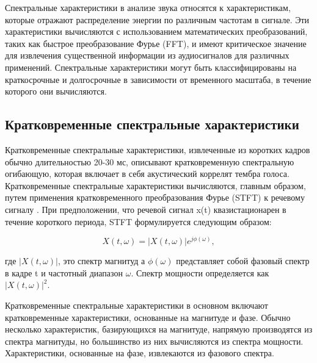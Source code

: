 Спектральные характеристики в анализе звука относятся к характеристикам, которые отражают распределение энергии по различным частотам в сигнале. Эти характеристики вычисляются с использованием математических преобразований, таких как быстрое преобразование Фурье (FFT), и имеют критическое значение для извлечения существенной информации из аудиосигналов для различных применений. Спектральные характеристики могут быть классифицированы на краткосрочные и долгосрочные в зависимости от временного масштаба, в течение которого они вычисляются.

\subsection{Кратковременные спектральные характеристики}

Кратковременные спектральные характеристики, извлеченные из коротких кадров обычно длительностью 20-30 мс, описывают кратковременную спектральную огибающую, которая включает в себя акустический коррелят тембра голоса. Кратковременные спектральные характеристики вычисляются, главным образом, путем применения кратковременного преобразования Фурье (STFT) к речевому сигналу \cite{xiao2015spoofing}. При предположении, что речевой сигнал x(t) квазистационарен в течение короткого периода, STFT формулируется следующим образом:


\begin{equation}
    X(t, \omega) = |X(t, \omega)| e^{j\phi(\omega)}
, \end{equation}

где \(|X(t, \omega)|\), это спектр магнитуд а \(\phi(\omega)\) представляет собой фазовый спектр в кадре t и частотный диапазон \(\omega\). Спектр мощности определяется как \(|X(t, \omega)|^2\).

Кратковременные спектральные характеристики в основном включают кратковременные характеристики, основанные на магнитуде и фазе. Обычно несколько характеристик, базирующихся на магнитуде, напрямую производятся из спектра магнитуды, но большинство из них вычисляются из спектра мощности. Характеристики, основанные на фазе, извлекаются из фазового спектра.


